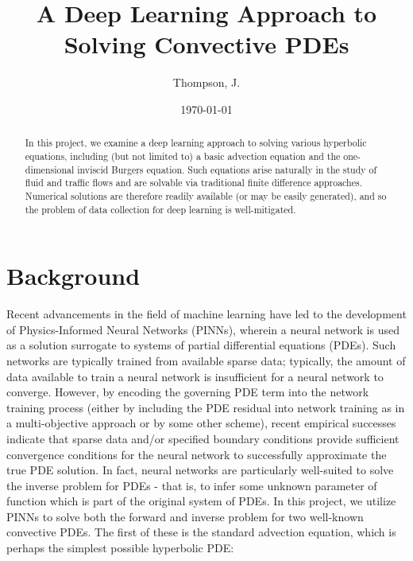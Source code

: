 \documentclass[letterpaper,11pt]{article}
\begin{document}
    \title{
        A Deep Learning Approach to Solving Convective PDEs\\
    }
    \author{%
        Thompson, J.
    }
    \date{\today}
    \maketitle

    \begin{abstract}
        In this project, we examine a deep learning approach to solving various hyperbolic equations, including 
        (but not limited to) a basic advection equation and the one-dimensional inviscid Burgers equation.
        Such equations arise naturally in the study of fluid and traffic flows and are solvable via traditional 
        finite difference approaches. Numerical solutions are therefore readily available (or may be easily generated),
        and so the problem of data collection for deep learning is well-mitigated.
    \end{abstract}


    \section{Background}\label{sec:background}
    Recent advancements in the field of machine learning have led to the development of Physics-Informed Neural 
    Networks (PINNs), wherein a neural network is used as a solution surrogate to systems of partial differential 
    equations (PDEs). Such networks are typically trained from available sparse data; typically, the amount of data
    available to train a neural network is insufficient for a neural network to converge. However, by encoding the 
    governing PDE term into the network training process (either by including the PDE residual into network training as
    in a multi-objective approach or by some other scheme), recent empirical successes indicate that
    sparse data and/or specified boundary conditions provide sufficient convergence conditions for the neural network to
    successfully approximate the true PDE solution.\cite{raissi_physics-informed_2019} In fact, neural networks are 
    particularly well-suited to solve the inverse problem for PDEs - that is, to infer some unknown parameter of 
    function which is part of the original system of PDEs.\cite{lu_deepxde_2021} In this project, we utilize PINNs to 
    solve both the forward and inverse problem for two well-known convective PDEs. The first of these is the standard 
    advection equation, which is perhaps the simplest possible hyperbolic PDE:
\end{document}
